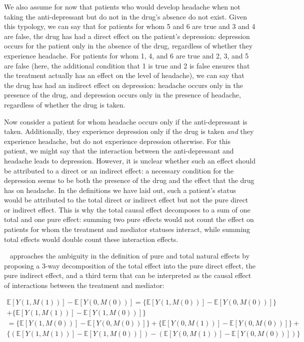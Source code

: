 We also assume for now that patients who would develop headache when not taking the anti-depressant but do not in the 
drug's absence do not exist. Given this typology, we can say that for patients for whom 5 and 6 are true and 3 and 4 are
false, the drug has had a direct effect on the patient's depression: depression occurs for the 
patient only in the absence of the drug, regardless of whether they experience headache. 
For patients for whom 1, 4, and 6 are true and 2, 3, and 5 are false (here, the additional condition that 1 is 
true and 2 is false ensures that the treatment actually has an effect on the level of headache), we can say
that the drug has had an indirect effect on depression: headache occurs only in the presence of the drug,
and depression occurs only in the presence of headache, regardless of whether the drug is taken. 

Now consider a patient for whom headache occurs only if the anti-depressant is taken. Additionally, they 
experience depression only if the drug is taken \textit{and} they experience headache, but do not experience
depression otherwise. For this patient, we might say that the interaction between the anti-depressant and 
headache leads to depression. However, it is unclear whether such an effect should be attributed to a direct or
an indirect effect: a necessary condition for the depression seems to be both the presence of the drug and 
the effect that the drug has on headache. In the definitions we have laid out, such a patient's status would be
attributed to the total direct or indirect effect but not the pure direct or indirect effect. This is why the
total causal effect decomposes to a sum of one total and one pure effect: summing two pure effects would not
count the effect on patients for whom the treatment and mediator statuses interact, while summing total effects 
would double count these interaction effects. 

~\cite{vanderweele2013} approaches the ambiguity in the definition of pure and total natural effects by proposing
a 3-way decomposition of the total effect into the pure direct effect, the pure indirect effect, and a third
term that can be interpreted as the causal effect of interactions between the treatment and mediator:

\begin{equation}
\begin{aligned}
	\mathbb{E}[Y(1,M(1))] - \mathbb{E}[Y(0,M(0))] = 
	\{\mathbb{E}[Y(1,M(0))] - \mathbb{E}[Y(0,M(0))]\}\\ 
	+ \{\mathbb{E}[Y(1,M(1))] - \mathbb{E}[Y(1,M(0))]\}\\
	= \{\mathbb{E}[Y(1,M(0))] - \mathbb{E}[Y(0,M(0))]\}
	+ \{\mathbb{E}[Y(0,M(1))] - \mathbb{E}[Y(0,M(0))]\} + \\
	\{(\mathbb{E}[Y(1,M(1))] - \mathbb{E}[Y(1,M(0))]) - 
	(\mathbb{E}[Y(0,M(1))] - \mathbb{E}[Y(0,M(0))])\}
\end{aligned}
\end{equation}

